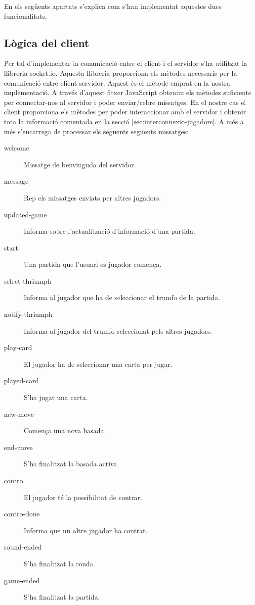 En els següents apartats s'explica com s'han implementat aquestes dues funcionalitats. 

\subsection{Lògica del client}

Per tal d'implementar la comunicació entre el client i el servidor s'ha utilitzat la llibreria socket.io. Aquesta llibreria proporciona els mètodes necessaris per la comunicació entre client servidor. Aquest és el mètode emprat en la nostra implementació. A través d'aquest fitxer JavaScript obtenim els mètodes suficients per connectar-nos al servidor i poder enviar/rebre missatges. En el nostre cas el client proporciona els mètodes per poder interaccionar amb el servidor i obtenir tota la informació comentada en la secció \ref{sec:interconnexio-jugadors}. A més a més s'encarrega de processar els següents següents missatges: 

\begin{description}
\item[welcome]{Missatge de benvinguda del servidor.}
\item[message]{Rep els missatges enviats per altres jugadors.}
\item[updated-game]{Informa sobre l'actualització d'informació d'una partida. }
\item[start]{Una partida que l'usuari es jugador comença.}
\item[select-thriumph]{Informa al jugador que ha de seleccionar el trumfo de la partida. }
\item[notify-thriumph]{Informa al jugador del trumfo seleccionat pels altres jugadors.}
\item[play-card]{El jugador ha de seleccionar una carta per jugar. }
\item[played-card]{S'ha jugat una carta.}
\item[new-move]{Comença una nova basada.}
\item[end-move]{S'ha finalitzat la basada activa.}
\item[contro]{El jugador té la possibilitat de contrar.}
\item[contro-done]{Informa que un altre jugador ha contrat.}
\item[round-ended]{S'ha finalitzat la ronda.}
\item[game-ended]{S'ha finalitzat la partida.}
\end{description}

